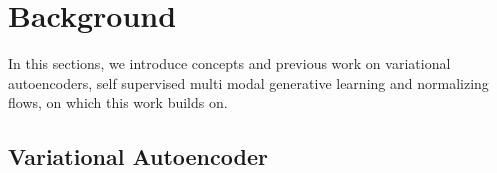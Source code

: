 \section{Background}
In this sections, we introduce concepts and previous work on variational autoencoders, self supervised multi modal generative learning and normalizing flows, on which this work builds on.


\subsection{Variational Autoencoder}
